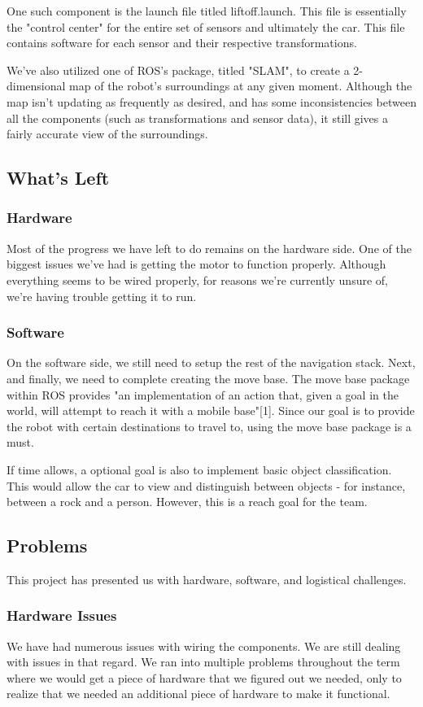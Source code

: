\documentclass[onecolumn, draftclsnofoot, 10pt, compsoc]{IEEEtran}
\begin{document}
One such component is the launch file titled liftoff.launch. This file is essentially the "control center" for the entire set of sensors and ultimately the car. This file contains software for each sensor and their respective transformations.

We've also utilized one of ROS's package, titled "SLAM", to create a 2-dimensional map of the robot's surroundings at any given moment. Although the map isn't updating as frequently as desired, and has some inconsistencies between all the components (such as transformations and sensor data), it still gives a fairly accurate view of the surroundings.

\subsection{What's Left}
\subsubsection{Hardware}
Most of the progress we have left to do remains on the hardware side. One of the biggest issues we've had is getting the motor to function properly. Although everything seems to be wired properly, for reasons we're currently unsure of, we're having trouble getting it to run.
    

\subsubsection{Software}
On the software side, we still need to setup the rest of the navigation stack. Next, and finally, we need to complete creating the move base. The move base package within ROS provides "an implementation of an action that, given a goal in the world, will attempt to reach it with a mobile base"[1]. Since our goal is to provide the robot with certain destinations to travel to, using the move base package is a must.

If time allows, a optional goal is also to implement basic object classification. This would allow the car to view and distinguish between objects - for instance, between a rock and a person. However, this is a reach goal for the team.


\subsection{Problems}
This project has presented us with hardware, software, and logistical challenges.

\subsubsection{Hardware Issues}
We have had numerous issues with wiring the components. We are still dealing with issues in that regard. We ran into multiple problems throughout the term where we would get a piece of hardware that we figured out we needed, only to realize that we needed an additional piece of hardware to make it functional. 
\end{document}
